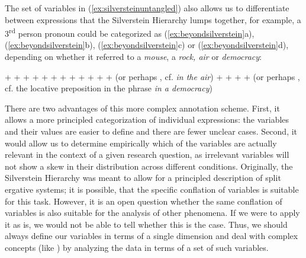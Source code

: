 The set of variables in (\ref{ex:silversteinuntangled}) also allows us to differentiate between expressions that the Silverstein  Hierarchy lumps together, for example, a 3\textsuperscript{rd} person pronoun  could be categorized  as (\ref{ex:beyondsilverstein}a), (\ref{ex:beyondsilverstein}b), (\ref{ex:beyondsilverstein}c) or (\ref{ex:beyondsilverstein}d), depending on whether it referred to a \textit{mouse}, a \textit{rock, air} or \textit{democracy}:

\begin{exe}
\ex
\begin{xlist}
\label{ex:beyondsilverstein}
\ex {} +  +  +  + 
\ex {} +  +  +  + 
\ex {} +  +  +  +  (or perhaps , cf. \textit{in the air})
\ex {} +  +  +  +  (or perhaps , cf. the locative preposition in the phrase \textit{in a democracy})
\end{xlist}
\end{exe}

There are two advantages of this more complex annotation  scheme. First, it allows a more principled categorization  of individual expressions: the variables and their values are easier to define and there are fewer unclear cases. Second, it would allow us to determine empirically which of the variables are actually relevant in the context of a given research question, as irrelevant variables will not show a skew in their distribution  across different conditions. Originally, the Silverstein  Hierarchy was meant to allow for a principled description  of split ergative systems; it is possible, that the specific conflation of variables is suitable for this task. However, it is an open question whether the same conflation of variables is also suitable for the analysis of other phenomena. If we were to apply it as is, we would not be able to tell whether this is the case. Thus, we should always define our variables in terms of a single dimension and deal with complex  concepts (like )  by analyzing the data in terms of a set of such variables.

